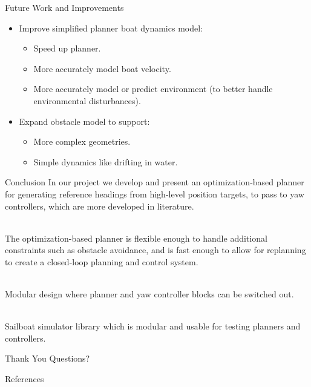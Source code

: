 \documentclass[10pt,xcolor={table,dvipsnames},t]{beamer}
\begin{document}
\begin{frame}{Future Work and Improvements}

\begin{itemize}
    \item Improve simplified planner boat dynamics model:
    \begin{itemize}
        \item Speed up planner.
        \item More accurately model boat velocity.
        \item More accurately model or predict environment (to better handle environmental disturbances).
    \end{itemize}
    \item Expand obstacle model to support:
        \begin{itemize}
            \item More complex geometries.
            \item Simple dynamics like drifting in water.
        \end{itemize}
\end{itemize}
    
\end{frame}

\begin{frame}{Conclusion}
    In our project we develop and present an optimization-based planner for generating
    reference headings from high-level position targets, to pass to yaw controllers, which are more developed in literature.
    
    \hfill\\
    The optimization-based planner is flexible enough to handle additional constraints such as  obstacle avoidance, and is fast enough to allow for replanning to create a closed-loop planning and control system.
    
    \hfill\\
    Modular design where planner and yaw controller blocks can be switched out.
    
    \hfill\\
    Sailboat simulator library which is modular and usable for testing planners and controllers.
\end{frame}

\begin{frame}{Thank You}
    Questions?
\end{frame}


\begin{frame}{References}
    \printbibliography{}
\end{frame}
\end{document}
